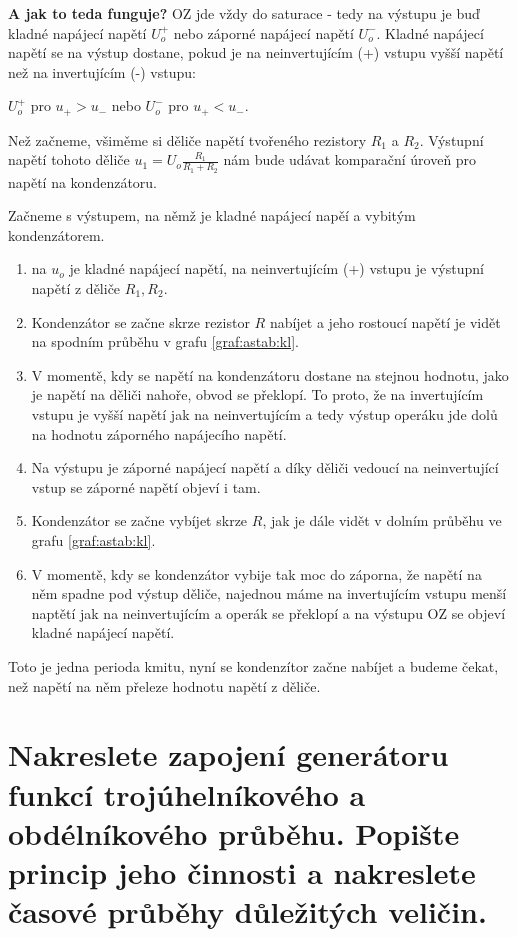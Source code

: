 \documentclass[a4paper,12pt]{article}   %
\begin{document}
\textbf{A jak to teda funguje?} OZ jde vždy do saturace - tedy na výstupu je buď kladné napájecí napětí $U_o^+$ nebo záporné napájecí napětí $U_o^-$. Kladné napájecí napětí se na výstup dostane, pokud je na neinvertujícím (+) vstupu vyšší napětí než na invertujícím (-) vstupu: 

\begin{center}
    $U_o^+$ pro $u_+ > u_-$ nebo $U_o^-$ pro $u_+ < u_-$.
\end{center}

Než začneme, všiměme si děliče napětí tvořeného rezistory $R_1$ a $R_2$. Výstupní napětí tohoto děliče $u_1 = U_o \frac{R_1}{R_1 + R_2}$ nám bude udávat komparační úroveň pro napětí na kondenzátoru.

Začneme s výstupem, na němž je kladné napájecí napěí a vybitým kondenzátorem.

\begin{enumerate}
    \item na $u_o$ je kladné napájecí napětí, na neinvertujícím (+) vstupu je výstupní napětí z děliče $R_1, R_2$.
    \item Kondenzátor se začne skrze rezistor $R$ nabíjet a jeho rostoucí napětí je vidět na spodním průběhu v grafu \ref{graf:astab:kl}.
    \item V momentě, kdy se napětí na kondenzátoru dostane na stejnou hodnotu, jako je napětí na děliči nahoře, obvod se překlopí. To proto, že na invertujícím vstupu je vyšší napětí jak na neinvertujícím a tedy výstup operáku jde dolů na hodnotu záporného napájecího napětí.
    \item Na výstupu je záporné napájecí napětí a díky děliči vedoucí na neinvertující vstup se záporné napětí objeví i tam.
    \item Kondenzátor se začne vybíjet skrze $R$, jak je dále vidět v dolním průběhu ve grafu \ref{graf:astab:kl}.
    \item V momentě, kdy se kondenzátor vybije tak moc do záporna, že napětí na něm spadne pod výstup děliče, najednou máme na invertujícím vstupu menší naptětí jak na neinvertujícím a operák se překlopí a na výstupu OZ se objeví kladné napájecí napětí.
\end{enumerate}
Toto je jedna perioda kmitu, nyní se kondenzítor začne nabíjet a budeme čekat, než napětí na něm přeleze hodnotu napětí z děliče.






\section{Nakreslete zapojení generátoru funkcí {trojúhelníkového a obdélníkového průběhu}. Popište princip jeho činnosti a nakreslete časové průběhy důležitých veličin.}
\end{document}
